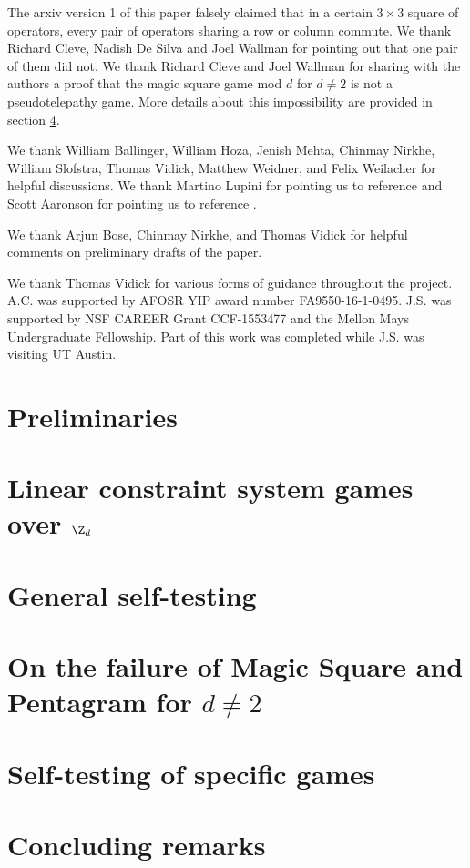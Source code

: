 \documentclass{article}
\begin{document}
The arxiv version 1 of this paper falsely claimed that in a certain $3\times 3$ square of operators, every pair of operators sharing a row or column commute. We thank Richard Cleve, Nadish De Silva and Joel Wallman for pointing out that one pair of them did not. 
We thank Richard Cleve and Joel Wallman for sharing with the authors a proof that the magic square game mod $d$ for $d\neq 2$ is not a pseudotelepathy game. More details about this impossibility are provided in section \ref{sec:impossibility}.

We thank 
William Ballinger,
William Hoza,
Jenish Mehta,
Chinmay Nirkhe,
William Slofstra,
Thomas Vidick,
Matthew Weidner,
and
Felix Weilacher
for helpful discussions.
We thank Martino Lupini for pointing us to reference \cite{de2017operator} and Scott Aaronson for pointing us to reference \cite{cleve2004consequences}.

We thank
Arjun Bose,
Chinmay Nirkhe, 
and 
Thomas Vidick
for helpful comments on preliminary drafts of the paper.

We thank Thomas Vidick for various forms of guidance throughout the project. A.C. was supported by AFOSR YIP award number FA9550-16-1-0495.
J.S. was supported by NSF CAREER Grant CCF-1553477 and the Mellon Mays Undergraduate Fellowship. 
Part of this work was completed while J.S. was visiting UT Austin. 

\tableofcontents


\section{Preliminaries}\label{sec:preliminaries}
	

\section{Linear constraint system games over $\Z_d$}\label{sec:linear-constraint-games}
	

\section{General self-testing}\label{sec:self-testing}
	

\section{On the failure of Magic Square and Pentagram for $d\neq 2$}\label{sec:impossibility}
	
	
\section{Self-testing of specific games}\label{sec:specific-games}
	
	


\section{Concluding remarks}






\end{document}
